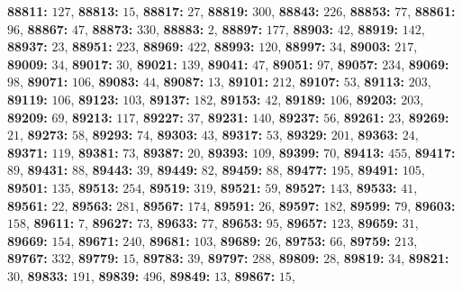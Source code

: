 \textsf{\bfseries 88811:} $127$, \textsf{\bfseries 88813:} $15$, \textsf{\bfseries 88817:} $27$, \textsf{\bfseries 88819:} $300$, \textsf{\bfseries 88843:} $226$, \textsf{\bfseries 88853:} $77$, \textsf{\bfseries 88861:} $96$, \textsf{\bfseries 88867:} $47$, \textsf{\bfseries 88873:} $330$, \textsf{\bfseries 88883:} $2$, \textsf{\bfseries 88897:} $177$, \textsf{\bfseries 88903:} $42$, \textsf{\bfseries 88919:} $142$, \textsf{\bfseries 88937:} $23$, \textsf{\bfseries 88951:} $223$, \textsf{\bfseries 88969:} $422$, \textsf{\bfseries 88993:} $120$, \textsf{\bfseries 88997:} $34$, \textsf{\bfseries 89003:} $217$, \textsf{\bfseries 89009:} $34$, \textsf{\bfseries 89017:} $30$, \textsf{\bfseries 89021:} $139$, \textsf{\bfseries 89041:} $47$, \textsf{\bfseries 89051:} $97$, \textsf{\bfseries 89057:} $234$, \textsf{\bfseries 89069:} $98$, \textsf{\bfseries 89071:} $106$, \textsf{\bfseries 89083:} $44$, \textsf{\bfseries 89087:} $13$, \textsf{\bfseries 89101:} $212$, \textsf{\bfseries 89107:} $53$, \textsf{\bfseries 89113:} $203$, \textsf{\bfseries 89119:} $106$, \textsf{\bfseries 89123:} $103$, \textsf{\bfseries 89137:} $182$, \textsf{\bfseries 89153:} $42$, \textsf{\bfseries 89189:} $106$, \textsf{\bfseries 89203:} $203$, \textsf{\bfseries 89209:} $69$, \textsf{\bfseries 89213:} $117$, \textsf{\bfseries 89227:} $37$, \textsf{\bfseries 89231:} $140$, \textsf{\bfseries 89237:} $56$, \textsf{\bfseries 89261:} $23$, \textsf{\bfseries 89269:} $21$, \textsf{\bfseries 89273:} $58$, \textsf{\bfseries 89293:} $74$, \textsf{\bfseries 89303:} $43$, \textsf{\bfseries 89317:} $53$, \textsf{\bfseries 89329:} $201$, \textsf{\bfseries 89363:} $24$, \textsf{\bfseries 89371:} $119$, \textsf{\bfseries 89381:} $73$, \textsf{\bfseries 89387:} $20$, \textsf{\bfseries 89393:} $109$, \textsf{\bfseries 89399:} $70$, \textsf{\bfseries 89413:} $455$, \textsf{\bfseries 89417:} $89$, \textsf{\bfseries 89431:} $88$, \textsf{\bfseries 89443:} $39$, \textsf{\bfseries 89449:} $82$, \textsf{\bfseries 89459:} $88$, \textsf{\bfseries 89477:} $195$, \textsf{\bfseries 89491:} $105$, \textsf{\bfseries 89501:} $135$, \textsf{\bfseries 89513:} $254$, \textsf{\bfseries 89519:} $319$, \textsf{\bfseries 89521:} $59$, \textsf{\bfseries 89527:} $143$, \textsf{\bfseries 89533:} $41$, \textsf{\bfseries 89561:} $22$, \textsf{\bfseries 89563:} $281$, \textsf{\bfseries 89567:} $174$, \textsf{\bfseries 89591:} $26$, \textsf{\bfseries 89597:} $182$, \textsf{\bfseries 89599:} $79$, \textsf{\bfseries 89603:} $158$, \textsf{\bfseries 89611:} $7$, \textsf{\bfseries 89627:} $73$, \textsf{\bfseries 89633:} $77$, \textsf{\bfseries 89653:} $95$, \textsf{\bfseries 89657:} $123$, \textsf{\bfseries 89659:} $31$, \textsf{\bfseries 89669:} $154$, \textsf{\bfseries 89671:} $240$, \textsf{\bfseries 89681:} $103$, \textsf{\bfseries 89689:} $26$, \textsf{\bfseries 89753:} $66$, \textsf{\bfseries 89759:} $213$, \textsf{\bfseries 89767:} $332$, \textsf{\bfseries 89779:} $15$, \textsf{\bfseries 89783:} $39$, \textsf{\bfseries 89797:} $288$, \textsf{\bfseries 89809:} $28$, \textsf{\bfseries 89819:} $34$, \textsf{\bfseries 89821:} $30$, \textsf{\bfseries 89833:} $191$, \textsf{\bfseries 89839:} $496$, \textsf{\bfseries 89849:} $13$, \textsf{\bfseries 89867:} $15$, 

